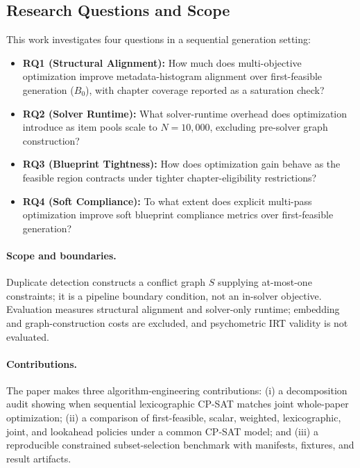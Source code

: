 \documentclass[runningheads]{llncs}
\begin{document}
\subsection{Research Questions and Scope}
This work investigates four questions in a sequential generation setting:
\begin{itemize}\setlength{\itemsep}{1pt}\setlength{\parskip}{0pt}
\item \textbf{RQ1 (Structural Alignment):} How much does multi-objective optimization improve metadata-histogram alignment over first-feasible generation ($B_0$), with chapter coverage reported as a saturation check?
\item \textbf{RQ2 (Solver Runtime):} What solver-runtime overhead does optimization introduce as item pools scale to $N=10{,}000$, excluding pre-solver graph construction?
\item \textbf{RQ3 (Blueprint Tightness):} How does optimization gain behave as the feasible region contracts under tighter chapter-eligibility restrictions?
\item \textbf{RQ4 (Soft Compliance):} To what extent does explicit multi-pass optimization improve soft blueprint compliance metrics over first-feasible generation?
\end{itemize}
\paragraph{Scope and boundaries.} Duplicate detection constructs a conflict graph $S$ supplying at-most-one constraints; it is a pipeline boundary condition, not an in-solver objective. Evaluation measures structural alignment and solver-only runtime; embedding and graph-construction costs are excluded, and psychometric IRT validity is not evaluated.
\paragraph{Contributions.} The paper makes three algorithm-engineering contributions: (i) a decomposition audit showing when sequential lexicographic CP-SAT matches joint whole-paper optimization; (ii) a comparison of first-feasible, scalar, weighted, lexicographic, joint, and lookahead policies under a common CP-SAT model; and (iii) a reproducible constrained subset-selection benchmark with manifests, fixtures, and result artifacts.
\end{document}
